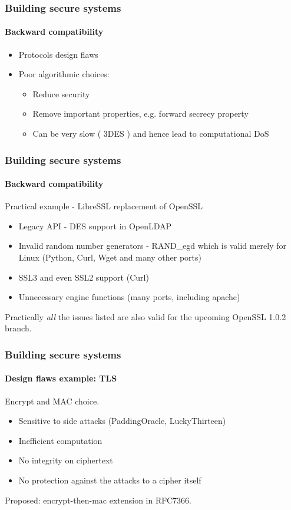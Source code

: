 \documentclass[11pt,t]{beamer}
\newcommand{\funcname}[1]{
	{\color{yellow!30} #1}
}
\newcommand{\cipher}[1]{
	{\color{blue!30} #1}
}
\begin{document}
\begin{frame}
\frametitle{Building secure systems}
\framesubtitle{Backward compatibility}
\begin{itemize}
\item<1-> Protocols design flaws
\item<2-> Poor algorithmic choices:
	\begin{itemize}
	\item Reduce security
	\item Remove important properties, e.g. forward secrecy property
	\item Can be very slow (\cipher{3DES}) and hence lead to computational DoS
	\end{itemize}
\end{itemize}
\end{frame}

\begin{frame}
\frametitle{Building secure systems}
\framesubtitle{Backward compatibility}
Practical example - LibreSSL replacement of OpenSSL
\begin{itemize}
\item Legacy API - \cipher{DES} support in OpenLDAP
\item Invalid random number generators - \funcname{RAND\_egd} which is valid merely for Linux (Python, Curl, Wget and many other ports)
\item SSL3 and even SSL2 support (Curl)
\item Unnecessary engine functions (many ports, including apache) 
\end{itemize}

Practically \textit{all} the issues listed are also valid for the upcoming OpenSSL 1.0.2 
branch.
\end{frame}

\begin{frame}
\frametitle{Building secure systems}
\framesubtitle{Design flaws example: TLS}
Encrypt and MAC choice.
\begin{itemize}
\item Sensitive to side attacks (PaddingOracle, LuckyThirteen)
\item Inefficient computation
\item No integrity on ciphertext
\item No protection against the attacks to a cipher itself
\end{itemize}
Proposed: encrypt-then-mac extension in RFC7366.
\end{frame}
\end{document}
